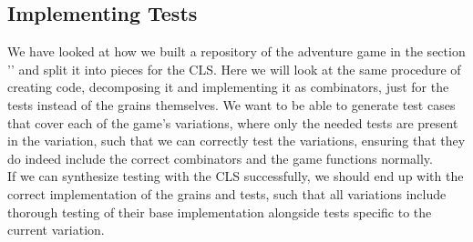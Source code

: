 \subsection{Implementing Tests}
We have looked at how we built a repository of the adventure game in the section '' and split it into pieces for the CLS. Here we will look at the same procedure of creating code, decomposing it and implementing it as combinators, just for the tests instead of the grains themselves. We want to be able to generate test cases that cover each of the game's variations, where only the needed tests are present in the variation, such that we can correctly test the variations, ensuring that they do indeed include the correct combinators and the game functions normally. \\
If we can synthesize testing with the CLS successfully, we should end up with the correct implementation of the grains and tests, such that all variations include thorough testing of their base implementation alongside tests specific to the current variation.  





